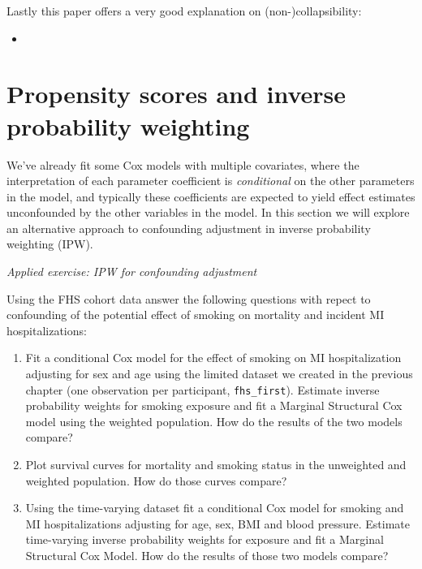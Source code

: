 \documentclass[
]{book}
\providecommand{\tightlist}{%
  \setlength{\itemsep}{0pt}\setlength{\parskip}{0pt}}
\begin{document}
Lastly this paper offers a very good explanation on (non-)collapsibility:

\begin{itemize}
\tightlist
\item
  \citet{greenland1999confounding}
\end{itemize}

\section{Propensity scores and inverse probability weighting}\label{propensity-scores-and-inverse-probability-weighting}

We've already fit some Cox models with multiple covariates, where the interpretation of each parameter coefficient is \emph{conditional} on the other parameters in the model, and typically these coefficients are expected to yield effect estimates unconfounded by the other variables in the model. In this section we will explore an alternative approach to confounding adjustment in inverse probability weighting (IPW).

\emph{Applied exercise: IPW for confounding adjustment}

Using the FHS cohort data answer the following questions with repect to confounding of the potential effect of smoking on mortality and incident MI hospitalizations:

\begin{enumerate}
\def\labelenumi{\arabic{enumi}.}
\tightlist
\item
  Fit a conditional Cox model for the effect of smoking on MI hospitalization adjusting for sex and age using the limited dataset we created in the previous chapter (one observation per participant, \texttt{fhs\_first}). Estimate inverse probability weights for smoking exposure and fit a Marginal Structural Cox model using the weighted population. How do the results of the two models compare?
\item
  Plot survival curves for mortality and smoking status in the unweighted and weighted population. How do those curves compare?
\item
  Using the time-varying dataset fit a conditional Cox model for smoking and MI hospitalizations adjusting for age, sex, BMI and blood pressure. Estimate time-varying inverse probability weights for exposure and fit a Marginal Structural Cox Model. How do the results of those two models compare?
\end{enumerate}
\end{document}
